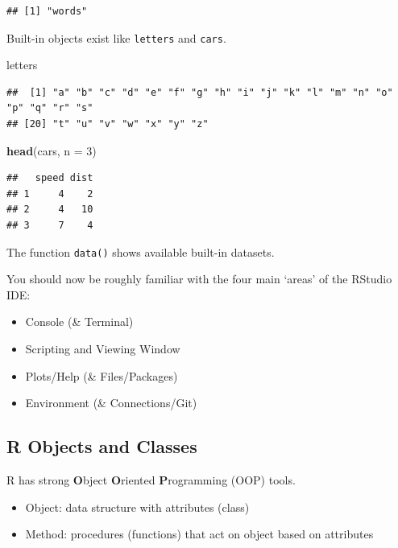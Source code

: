 \documentclass[
]{book}
\newenvironment{Shaded}{\begin{snugshade}}{\end{snugshade}}
\newcommand{\DataTypeTok}[1]{\textcolor[rgb]{0.13,0.29,0.53}{#1}}
\newcommand{\DecValTok}[1]{\textcolor[rgb]{0.00,0.00,0.81}{#1}}
\newcommand{\KeywordTok}[1]{\textcolor[rgb]{0.13,0.29,0.53}{\textbf{#1}}}
\newcommand{\NormalTok}[1]{#1}
\theoremstyle{definition}
\theoremstyle{definition}
\theoremstyle{definition}
\theoremstyle{remark}
\begin{document}
\begin{verbatim}
## [1] "words"
\end{verbatim}

Built-in objects exist like \texttt{letters} and \texttt{cars}.

\begin{Shaded}
\begin{Highlighting}[]
\NormalTok{letters}
\end{Highlighting}
\end{Shaded}

\begin{verbatim}
##  [1] "a" "b" "c" "d" "e" "f" "g" "h" "i" "j" "k" "l" "m" "n" "o" "p" "q" "r" "s"
## [20] "t" "u" "v" "w" "x" "y" "z"
\end{verbatim}

\begin{Shaded}
\begin{Highlighting}[]
\KeywordTok{head}\NormalTok{(cars, }\DataTypeTok{n =} \DecValTok{3}\NormalTok{)}
\end{Highlighting}
\end{Shaded}

\begin{verbatim}
##   speed dist
## 1     4    2
## 2     4   10
## 3     7    4
\end{verbatim}

The function \texttt{data()} shows available built-in datasets.

You should now be roughly familiar with the four main `areas' of the RStudio IDE:

\begin{itemize}
\item
  Console (\& Terminal)
\item
  Scripting and Viewing Window
\item
  Plots/Help (\& Files/Packages)
\item
  Environment (\& Connections/Git)
\end{itemize}

\hypertarget{r-objects-and-classes}{%
\subsection{R Objects and Classes}\label{r-objects-and-classes}}

R has strong \textbf{O}bject \textbf{O}riented \textbf{P}rogramming (OOP) tools.

\begin{itemize}
\item
  Object: data structure with attributes (class)
\item
  Method: procedures (functions) that act on object based on attributes
\end{itemize}
\end{document}
